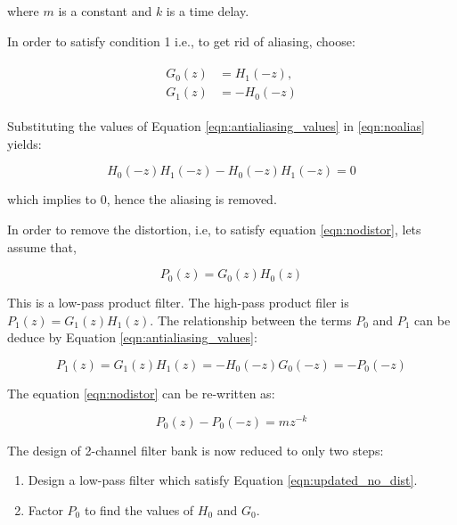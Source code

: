 where $m$ is a constant and $k$ is a time delay.

In order to satisfy condition 1 i.e., to get rid of aliasing, choose:

\begin{align}
	\label{eqn:antialiasing_values}
	\begin{split}
		G_0(z) &=  H_1(-z), \\ 
		G_1(z) &=  -H_0(-z)
	\end{split}
\end{align}

Substituting the values of Equation \ref{eqn:antialiasing_values} in  \ref{eqn:noalias} yields:

\begin{equation} \label{eqn:aliasrem}
{H_{0}(-z)H_1(-z)-H_0(-z)H_{1}(-z) = 0}
\end{equation}

which implies to 0, hence the aliasing is removed.

In order to remove the distortion, i.e, to satisfy equation \ref{eqn:nodistor}, lets assume that,

\begin{equation}\label{eqn:p0} 
{P_0(z)=G_{0}(z)H_{0}(z)}
\end{equation}

This is a low-pass product filter. The high-pass product filer is ${P_1(z)=G_{1}(z)H_{1}(z)}$. The relationship between the terms $P_0$ and $P_1$ can be deduce by Equation \ref{eqn:antialiasing_values}:

\begin{equation} 
{P_1(z) = G_{1}(z)H_{1}(z) = -H_{0}(-z)G_{0}(-z) = -P_0(-z)}
\end{equation}

The equation \ref{eqn:nodistor} can be re-written as:

\begin{equation}\label{eqn:updated_no_dist} 
{P_0(z) - P_0(-z) =  mz^{-k}}
\end{equation}

The design of 2-channel filter bank is now reduced to only two steps:

\begin{enumerate}
	\item Design a low-pass filter which satisfy Equation \ref{eqn:updated_no_dist}.
	\item Factor $P_0$ to find the values of $H_0$ and $G_0$.
\end{enumerate}

